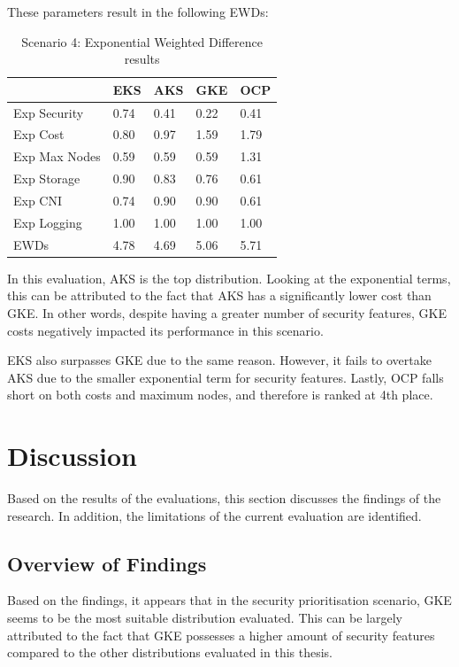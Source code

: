 These parameters result in the following EWDs:

\begin{table}[!ht]
    \centering
    \begin{tabular}{|p{4cm}|p{2cm}|p{2cm}|p{2cm}|p{2cm}|} %
    \hline
         & EKS& AKS& GKE& OCP\\ \hline
        Exp Security & 0.74 & 0.41 & 0.22 & 0.41 \\ \hline
        Exp Cost & 0.80 & 0.97 & 1.59 & 1.79 \\ \hline
        Exp Max Nodes & 0.59 & 0.59 & 0.59 & 1.31 \\ \hline
        Exp Storage & 0.90 & 0.83 & 0.76 & 0.61 \\ \hline
        Exp CNI & 0.74 & 0.90 & 0.90 & 0.61 \\ \hline
        Exp Logging & 1.00 & 1.00 & 1.00 & 1.00 \\ \hline
 EWDs& 4.78& 4.69 & 5.06 & 5.71 \\\hline
    \end{tabular}
    \caption{Scenario 4: Exponential Weighted Difference results} 
    \label{tab:scenario-4-ewds}
\end{table}

In this evaluation, AKS is the top distribution. Looking at the exponential terms, this can be attributed to the fact that AKS has a significantly lower cost than GKE. In other words, despite having a greater number of security features, GKE costs negatively impacted its performance in this scenario.

EKS also surpasses GKE due to the same reason. However, it fails to overtake AKS due to the smaller exponential term for security features. Lastly, OCP falls short on both costs and maximum nodes, and therefore is ranked at 4th place.

\chapter{Discussion}\label{discussion}
Based on the results of the evaluations, this section discusses the findings of the research. In addition, the limitations of the current evaluation are identified.

\section{Overview of Findings}
Based on the findings, it appears that in the security prioritisation scenario, GKE seems to be the most suitable distribution evaluated. This can be largely attributed to the fact that GKE possesses a higher amount of security features compared to the other distributions evaluated in this thesis.


